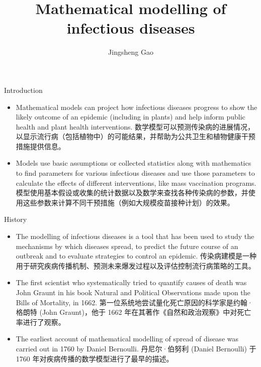 \documentclass[
  notheorems,
  aspectratio=54,
]{beamer}
\title{Mathematical modelling of infectious diseases}
\author{Jingsheng Gao}
\institute{Anqing Normal University}
\begin{document}
\begin{frame}
    \titlepage
\end{frame}

\begin{frame}{Introduction}
 \begin{itemize}
    \item Mathematical models can project how infectious diseases progress to show the likely outcome of an epidemic (including in plants) and help inform public health and plant health interventions. 数学模型可以预测传染病的进展情况，以显示流行病（包括植物中）的可能结果，并帮助为公共卫生和植物健康干预措施提供信息。
    \item Models use basic assumptions or collected statistics along with mathematics to find parameters for various infectious diseases and use those parameters to calculate the effects of different interventions, like mass vaccination programs. 模型使用基本假设或收集的统计数据以及数学来查找各种传染病的参数，并使用这些参数来计算不同干预措施（例如大规模疫苗接种计划）的效果。
  \end{itemize}
\end{frame}

\begin{frame}{History}
  \begin{figure}
    \centering
  \end{figure}
  \begin{itemize}
    \item The modelling of infectious diseases is a tool that has been used to study the mechanisms by which diseases spread, to predict the future course of an outbreak and to evaluate strategies to control an epidemic. 传染病建模是一种用于研究疾病传播机制、预测未来爆发过程以及评估控制流行病策略的工具。
    \item The first scientist who systematically tried to quantify causes of death was John Graunt in his book Natural and Political Observations made upon the Bills of Mortality, in 1662. 第一位系统地尝试量化死亡原因的科学家是约翰·格朗特 (John Graunt)，他于 1662 年在其著作《自然和政治观察》中对死亡率进行了观察。
    \item The earliest account of mathematical modelling of spread of disease was carried out in 1760 by Daniel Bernoulli. 丹尼尔·伯努利 (Daniel Bernoulli) 于 1760 年对疾病传播的数学模型进行了最早的描述。
  \end{itemize}
\end{frame}
\end{document}

